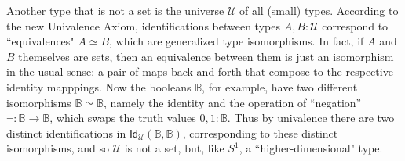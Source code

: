 \documentclass[11pt]{article}
\newcommand{\B}{\ensuremath{\mathbb{B}}}
\newcommand{\Id}{\mathsf{Id}}
\newcommand{\id}[1]{\Id_{#1}}
\newcommand{\U}{\ensuremath{\mathcal{U}}}
\theoremstyle{remark}
\theoremstyle{definition}
\begin{document}
 Another type that is not a set is the universe $\U$ of all (small) types.  According to the new Univalence Axiom, identifications between types $A,B:\U$ correspond to ``equivalences" $A\simeq B$, which are generalized type isomorphisms.  In fact, if $A$ and $B$ themselves are sets, then an equivalence between them is just an isomorphism in the usual sense: a pair of maps back and forth that compose to the respective identity mapppings.  Now the booleans $\B$, for example, have two different isomorphisms $\B\simeq \B$, namely the identity and the operation of ``negation'' $\neg:\B\to\B$, which swaps the truth values $0,1:\B$.  Thus by univalence there are two distinct identifications in $\id{\U}(\B,\B)$, corresponding to these distinct isomorphisms, and so $\U$ is not a set, but, like $S^1$, a ``higher-dimensional" type.  
 
\end{document}
